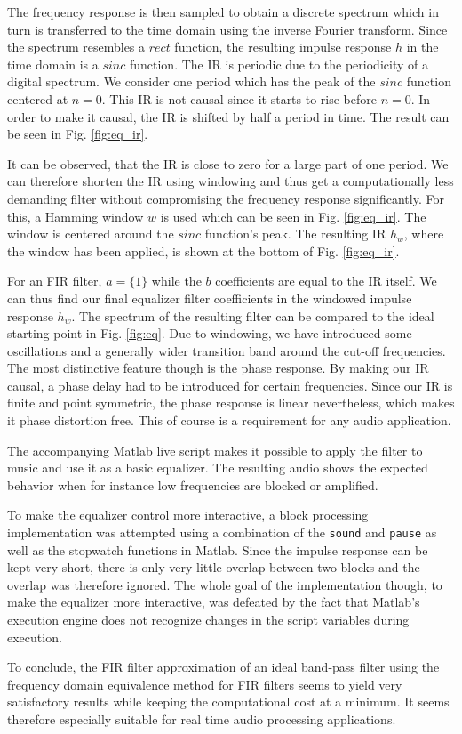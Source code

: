 \documentclass[journal]{IEEEtran}
\begin{document}
The frequency response is then sampled to obtain a discrete spectrum which in turn is transferred to the time domain using the inverse Fourier transform. Since the spectrum resembles a $rect$ function, the resulting impulse response $h$ in the time domain is a $sinc$ function. The IR is periodic due to the periodicity of a digital spectrum. We consider one period which has the peak of the $sinc$ function centered at $n=0$. This IR is not causal since it starts to rise before $n=0$. In order to make it causal, the IR is shifted by half a period in time. The result can be seen in Fig. \ref{fig:eq_ir}. 

It can be observed, that the IR is close to zero for a large part of one period. We can therefore shorten the IR using windowing and thus get a computationally less demanding filter without compromising the frequency response significantly. For this, a Hamming window $w$ is used which can be seen in Fig. \ref{fig:eq_ir}. The window is centered around the $sinc$ function's peak. The resulting IR $h_w$, where the window has been applied, is shown at the bottom of Fig. \ref{fig:eq_ir}.

For an FIR filter, $a = \{1\}$ while the $b$ coefficients are equal to the IR itself. We can thus find our final equalizer filter coefficients in the windowed impulse response $h_w$. The spectrum of the resulting filter can be compared to the ideal starting point in Fig. \ref{fig:eq}. Due to windowing, we have introduced some oscillations and a generally wider transition band around the cut-off frequencies. The most distinctive feature though is the phase response. By making our IR causal, a phase delay had to be introduced for certain frequencies. Since our IR is finite and point symmetric, the phase response is linear nevertheless, which makes it phase distortion free. This of course is a requirement for any audio application. 

The accompanying Matlab live script makes it possible to apply the filter to music and use it as a basic equalizer. The resulting audio shows the expected behavior when for instance low frequencies are blocked or amplified. 

To make the equalizer control more interactive, a block processing implementation was attempted using a combination of the \texttt{sound} and \texttt{pause} as well as the stopwatch functions in Matlab. Since the impulse response can be kept very short, there is only very little overlap between two blocks and the overlap was therefore ignored. The whole goal of the implementation though, to make the equalizer more interactive, was defeated by the fact that Matlab's execution engine does not recognize changes in the script variables during execution.

To conclude, the FIR filter approximation of an ideal band-pass filter using the frequency domain equivalence method for FIR filters seems to yield very satisfactory results while keeping the computational cost at a minimum. It seems therefore especially suitable for real time audio processing applications.
\end{document}
